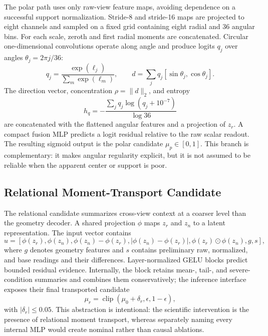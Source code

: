 \documentclass[electronics,article,submit,oneauthor]{Definitions/mdpi}
\begin{document}
The polar path uses only raw-view feature maps, avoiding dependence on a successful support normalization. Stride-8 and stride-16 maps are projected to eight channels and sampled on a fixed grid containing eight radial and 36 angular bins. For each scale, zeroth and first radial moments are concatenated. Circular one-dimensional convolutions operate along angle and produce logits $q_j$ over angles $\theta_j=2\pi j/36$:
\begin{equation}
q_j=\frac{\exp(\ell_j)}{\sum_m\exp(\ell_m)},\qquad
d=\sum_j q_j[\sin\theta_j,\cos\theta_j].
\label{eq:polar_direction}
\end{equation}
The direction vector, concentration $\rho=\lVert d\rVert_2$, and entropy
\begin{equation}
h_q=-\frac{\sum_j q_j\log(q_j+10^{-7})}{\log 36}
\label{eq:polar_entropy}
\end{equation}
are concatenated with the flattened angular features and a projection of $z_r$. A compact fusion MLP predicts a logit residual relative to the raw scalar readout. The resulting sigmoid output is the polar candidate $\mu_p\in[0,1]$. This branch is complementary: it makes angular regularity explicit, but it is not assumed to be reliable when the apparent center or support is poor.

\subsection{Relational Moment-Transport Candidate}
\label{subsec:relational}

The relational candidate summarizes cross-view context at a coarser level than the geometry decoder. A shared projection $\phi$ maps $z_r$ and $z_n$ to a latent representation. The input vector contains
\begin{equation}
u=\left[\phi(z_r),\phi(z_n),\phi(z_n)-\phi(z_r),
|\phi(z_n)-\phi(z_r)|,\phi(z_r)\odot\phi(z_n),g,s\right],
\label{eq:relational_features}
\end{equation}
where $g$ denotes geometry features and $s$ contains preliminary raw, normalized, and base readings and their differences. Layer-normalized GELU blocks predict bounded residual evidence. Internally, the block retains mean-, tail-, and severe-condition summaries and combines them conservatively; the inference interface exposes their final transported candidate
\begin{equation}
\mu_r=\operatorname{clip}(\mu_0+\delta_r,\epsilon,1-\epsilon),
\label{eq:relational_candidate}
\end{equation}
with $|\delta_r|\leq0.05$. This abstraction is intentional: the scientific intervention is the presence of relational moment transport, whereas separately naming every internal MLP would create nominal rather than causal ablations.
\end{document}
